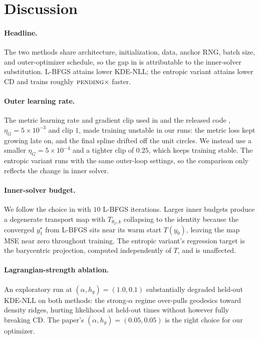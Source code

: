 \documentclass[11pt,a4paper]{article}
\newcommand{\maxiterLBFGS}{10}%
\newcommand{\wallRatio}{\textsc{pending}}%
\begin{document}
\section{Discussion}
\label{sec:discussion}

\paragraph{Headline.}
The two methods share architecture, initialization, data, anchor RNG,
batch size, and outer-optimizer schedule, so the gap in
 is attributable to the inner-solver substitution.
L-BFGS attains lower KDE-NLL; the entropic variant attains lower CD
and trains roughly $\wallRatio\times$ faster.

\paragraph{Outer learning rate.}
The metric learning rate and gradient clip used in
\citet{amad2026hti} and the released code \citep{amad2026hticode},
$\eta_G = 5\times 10^{-3}$ and clip $1$, made training unstable in
our runs: the metric loss kept growing late on, and the final spline
drifted off the unit circles. We instead use a smaller
$\eta_G = 5\times 10^{-4}$ and a tighter clip of $0.25$, which keeps
training stable. The entropic variant runs with the same outer-loop
settings, so the comparison only reflects the change in inner
solver.

\paragraph{Inner-solver budget.}
We follow the choice in \citet{amad2026hti} with $\maxiterLBFGS$ L-BFGS iterations. Larger
inner budgets produce a degenerate transport map with $T_{\theta_T,k}$ collapsing to the identity because the converged $y_1^\star$ from L-BFGS sits near its warm start $T(y_0)$,
leaving the map MSE near zero throughout training. The entropic
variant's regression target is the barycentric projection, computed
independently of $T$, and is unaffected.

\paragraph{Lagrangian-strength ablation.}
An exploratory run at $(\alpha, h_y) = (1.0, 0.1)$ substantially
degraded held-out KDE-NLL on both methods: the strong-$\alpha$ regime
over-pulls geodesics toward density ridges, hurting likelihood at
held-out times without however fully breaking CD. The paper's
$(\alpha, h_y) = (0.05, 0.05)$ is the right choice for our optimizer.
\end{document}
